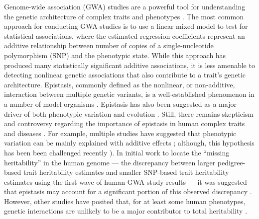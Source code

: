 \documentclass[10pt]{article}
\begin{document}
Genome-wide association (GWA) studies are a powerful tool for understanding the genetic architecture of complex traits and phenotypes \cite{Buniello2019}. The most common approach for conducting GWA studies is to use a linear mixed model to test for statistical associations, where the estimated regression coefficients represent an additive relationship between number of copies of a single-nucleotide polymorphism (SNP) and the phenotypic state. While this approach has produced many statistically significant additive associations, it is less amenable to detecting nonlinear genetic associations that also contribute to a trait's genetic architecture. Epistasis, commonly defined as the nonlinear, or non-additive, interaction between multiple genetic variants, is a well-established phenomenon in a number of model organisms \cite{Lehner2006,Rowe2008,Shao2008,Flint2009,Costanzo2010,He2010,Jarvis2011,Pettersson2011,Bloom2013,Monnahan2015}. Epistasis has also been suggested as a major driver of both phenotypic variation and evolution \cite{Carlborg2004,Carlborg2006,Martin2007,Phillips2008,Moore2009,Zuk2012,Jones2014,Mackay2014}. Still, there remains skepticism and controversy regarding the importance of epistasis in human complex traits and diseases \cite{Hill2008,Crow2010,Yang2010,Aschard2012,Powell2013,Maki-Tanila2014,Wood2014a,Yang2015}. For example, multiple studies have suggested that phenotypic variation can be mainly explained with additive effects \cite{Hill2008,Crow2010,Maki-Tanila2014}; although, this hypothesis has been been challenged recently \cite{Huang2016}). In initial work to locate the  ``missing heritability'' in the human genome --- the discrepancy between larger pedigree-based trait heritability estimates and smaller SNP-based trait heritability estimates using the first wave of human GWA study results \cite{Maher2008,Manolio2009,Eichler2010} --- it was suggested that epistasis may account for a significant portion of this observed discrepancy \cite{Slatkin2009,Zuk2012,Hemani2013}. However, other studies have posited that, for at least some human phenotypes, genetic interactions are unlikely to be a major contributor to total heritability \cite{Yang2015}.
\end{document}
